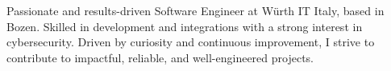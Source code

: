 
\begin{cvparagraph}

	Passionate and results-driven Software Engineer at Würth IT Italy, based in Bozen.
    Skilled in development and integrations with a strong interest in cybersecurity.
    Driven by curiosity and continuous improvement, I strive to contribute to impactful, reliable, and well-engineered projects.

\end{cvparagraph}
